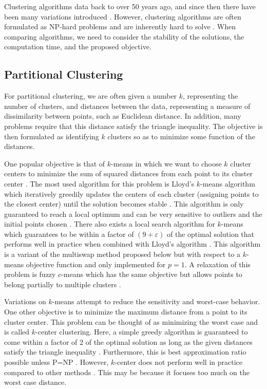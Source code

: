 \documentclass{article}
\begin{document}
Clustering algorithms data back to over 50 years ago, and since then there have been many variations introduced \cite{Jain}. However, clustering algorithms are often formulated as NP-hard problems and are inherently hard to solve \cite{Jain}. When comparing algorithms, we need to consider the stability of the solutions, the computation time, and the proposed objective. 

\subsection{Partitional Clustering}

For partitional clustering, we are often given a number $k$, representing the number of clusters, and distances between the data, representing a measure of dissimilarity between points, such as Euclidean distance. In addition, many problems require that this distance satisfy the triangle inequality. The objective is then formulated as identifying $k$ clusters so as to minimize some function of the distances. 

One popular objective is that of $k$-means in which we want to choose $k$ cluster centers to minimize the sum of squared distances from each point to its cluster center \cite{Jain}. The most used algorithm for this problem is Lloyd's $k$-means algorithm which iteratively greedily updates the centers of each cluster (assigning points to the closest center) until the solution becomes stable \cite{Jain}. This algorithm is only guaranteed to reach a local optimum and can be very sensitive to outliers and the initial points chosen \cite{Kanungo}. There also exists a local search algorithm for $k$-means which guarantees to be within a factor of $(9+\varepsilon)$ of the optimal solution that performs well in practice when combined with Lloyd's algorithm \cite{Kanungo}. This algorithm is a variant of the multiswap method proposed below but with respect to a $k$-means objective function and only implemented for $p=1$. A relaxation of this problem is fuzzy $c$-means which has the same objective but allows points to belong partially to multiple clusters \cite{ESL}.

Variations on $k$-means attempt to reduce the sensitivity and worst-case behavior. One other objective is to minimize the maximum distance from a point to its cluster center. This problem can be thought of as minimizing the worst case and is called $k$-center clustering. Here, a simple greedy algorithm is guaranteed to come within a factor of $2$ of the optimal solution as long as the given distances satisfy the triangle inequality \cite{Gonzalez}. Furthermore, this is best approximation ratio possible unless P=NP \cite{Shmoys}.  However, $k$-center does not perform well in practice compared to other methods \cite{Murphy}. This may be because it focuses too much on the worst case distance.
\end{document}
